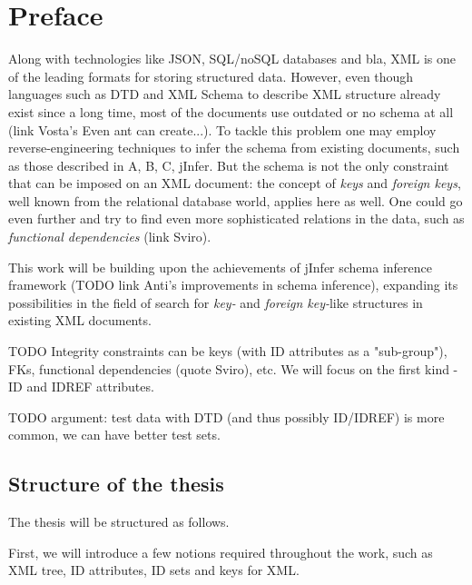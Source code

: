 \documentclass[a4paper,12pt,oneside]{report}
\let\openright=\clearpage
\def\chapwithtoc#1{
\chapter*{#1}
\addcontentsline{toc}{chapter}{#1}
}
\begin{document}
\newpage


\openright
\pagestyle{plain}
\setcounter{page}{1}
\tableofcontents

\newpage


\chapwithtoc{Preface}

Along with technologies like JSON, SQL/noSQL databases and bla, XML is one of the leading formats for storing structured data. However, even though languages such as DTD and XML Schema to describe XML structure already exist since a long time, most of the documents use outdated or no schema at all (link Vosta's Even ant can create...). To tackle this problem one may employ reverse-engineering techniques to infer the schema from existing documents, such as those described in A, B, C, jInfer. But the schema is not the only constraint that can be imposed on an XML document: the concept of \textit{keys} and \textit{foreign keys}, well known from the relational database world, applies here as well. One could go even further and try to find even more sophisticated relations in the data, such as \textit{functional dependencies} (link Sviro).

This work will be building upon the achievements of jInfer schema inference framework (TODO link Anti's improvements in schema inference), expanding its possibilities in the field of search for \textit{key-} and \textit{foreign key-}like structures in existing XML documents.

TODO Integrity constraints can be keys (with ID attributes as a "sub-group"), FKs, functional dependencies (quote Sviro), etc.
We will focus on the first kind - ID and IDREF attributes.

TODO argument: test data with DTD (and thus possibly ID/IDREF) is more common, we can have better test sets.

\section{Structure of the thesis}

The thesis will be structured as follows. 

First, we will introduce a few notions required throughout the work, such as XML tree, ID attributes, ID sets and keys for XML. 
\end{document}
